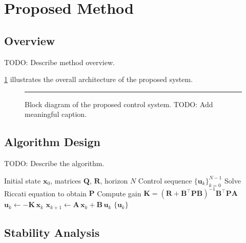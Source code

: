 \documentclass[journal]{IEEEtran}
\newcommand{\bx}{\bm{x}}          %
\newcommand{\bu}{\bm{u}}          %
\newcommand{\bA}{\bm{A}}          %
\newcommand{\bB}{\bm{B}}          %
\newcommand{\bK}{\bm{K}}          %
\newcommand{\bP}{\bm{P}}          %
\newcommand{\bQ}{\bm{Q}}          %
\newcommand{\bR}{\bm{R}}          %
\newcommand{\T}{^{\top}}           %
\begin{document}
\section{Proposed Method}
\label{sec:method}

\subsection{Overview}

TODO: Describe method overview.

\cref{fig:block} illustrates the overall architecture of the proposed system.

\begin{figure}[htbp]
  \centering
  \rule{\columnwidth}{0.4pt}   %
  \vspace{1em}
  \caption{Block diagram of the proposed control system.
           TODO: Add meaningful caption.}
  \label{fig:block}
\end{figure}

\subsection{Algorithm Design}

TODO: Describe the algorithm.

\begin{algorithm}[htbp]
  \caption{TODO: Algorithm name}
  \label{alg:proposed}
  \begin{algorithmic}[1]
    \Require Initial state $\bx_0$, matrices $\bQ$, $\bR$, horizon $N$
    \Ensure Control sequence $\{\bu_k\}_{k=0}^{N-1}$
    \State Solve Riccati equation to obtain $\bP$
    \State Compute gain $\bK = (\bR + \bB\T\bP\bB)^{-1}\bB\T\bP\bA$
      \State $\bu_k \gets -\bK\,\bx_k$
      \State $\bx_{k+1} \gets \bA\,\bx_k + \bB\,\bu_k$
    \EndFor
    \State \Return $\{\bu_k\}$
  \end{algorithmic}
\end{algorithm}

\subsection{Stability Analysis}
\end{document}
